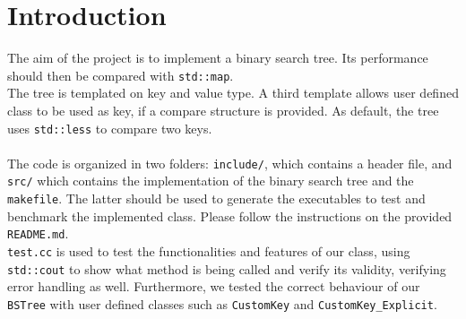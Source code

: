 \documentclass[12pt,a4paper,openany]{scrartcl}
\begin{document}
	
	\maketitle
	
	
\section{Introduction}
	The aim of the project is to implement a binary search tree. Its performance should then be compared with \texttt{std::map}.\\
    The tree is templated on key and value type. A third template allows user defined class to be used as key, if a compare structure is provided. As default, the tree uses \texttt{std::less} to compare two keys.\\\\
    The code is organized in two folders: \texttt{include/}, which contains a header file, and \texttt{src/} which contains the implementation of the binary search tree and the \texttt{makefile}. The latter should be used to generate the executables to test and benchmark the implemented class. Please follow the instructions on the provided \texttt{README.md}.\\
    \texttt{test.cc} is used to test the functionalities and features of our class, using \texttt{std::cout} to show what method is being called and verify its validity, verifying error handling as well. Furthermore, we tested the correct behaviour of our \texttt{BSTree} with user defined classes such as \texttt{CustomKey} and \texttt{CustomKey\_Explicit}.
	
\end{document}
